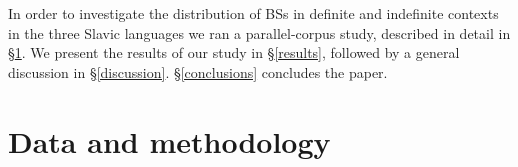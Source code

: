 \documentclass[output=paper,colorlinks,citecolor=brown]{langscibook}
\begin{document}
In order to investigate the distribution of BSs in definite and indefinite contexts in the three Slavic languages we ran a parallel-corpus study, described in detail in \S \ref{study}. We present the results of our study in \S \ref{results}, followed by a general discussion in \S \ref{discussion}. \S \ref{conclusions} concludes the paper. 



\section{Data and methodology}\label{study}

\end{document}
